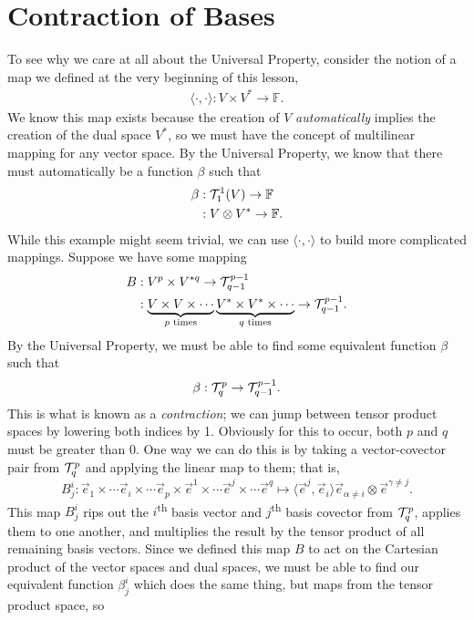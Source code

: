 \section{Contraction of Bases}
To see why we care at all about the Universal Property, consider the notion of a map we defined at the very beginning of this lesson,
\begin{align*}
    \langle \cdot, \cdot \rangle : V \times V^* \to \mathbb{F}.
\end{align*}
We know this map exists because the creation of $V$ \emph{automatically} implies the creation of the dual space $V^*$, so we must have the concept of multilinear mapping for any vector space.
By the Universal Property, we know that there must automatically be a function $\beta$ such that
\begin{align*}
    \beta &: \mathcal{T}^1_1 (V) \to \mathbb{F} \\
      &: V \otimes V^* \to \mathbb{F}.
\end{align*}
While this example might seem trivial, we can use $\langle \cdot, \cdot \rangle$ to build more complicated mappings.
Suppose we have some mapping
\begin{align*}
    B &: V^p \times V^{*q} \to \mathcal{T}^{p-1}_{q-1} \\
      &: \underbrace{V \times V \times \cdots}_{\text{$p$ times}}\underbrace{V^* \times V^* \times \cdots}_{\text{$q$ times}} \to \mathcal{T}^{p-1}_{q-1}.
\end{align*}
By the Universal Property, we must be able to find some equivalent function $\beta$ such that
\[ \beta : \mathcal{T}^p_q \to \mathcal{T}^{p-1}_{q-1}. \]
This is what is known as a \emph{contraction}; we can jump between tensor product spaces by lowering both indices by 1.
Obviously for this to occur, both $p$ and $q$ must be greater than 0.
One way we can do this is by taking a vector-covector pair from $\mathcal{T}^p_q$ and applying the linear map to them; that is,
\[ B^i_j : \vec{e}_1 \times \cdots \vec{e}_i \times \cdots \vec{e}_p \times \vec{e}^1 \times \cdots \vec{e}^j \times \cdots \vec{e}^q \mapsto \langle \vec{e}^j, \vec{e}_i \rangle \vec{e}_{\alpha \not= i} \otimes \vec{e}^{\gamma \not= j}. \]
This map $B^i_j$ rips out the $i$\textsuperscript{th} basis vector and $j$\textsuperscript{th} basis covector from $\mathcal{T}^p_q$, applies them to one another, and multiplies the result by the tensor product of all remaining basis vectors.
Since we defined this map $B$ to act on the Cartesian product of the vector spaces and dual spaces, we must be able to find our equivalent function $\beta^i_j$ which does the same thing, but maps from the tensor product space, so
